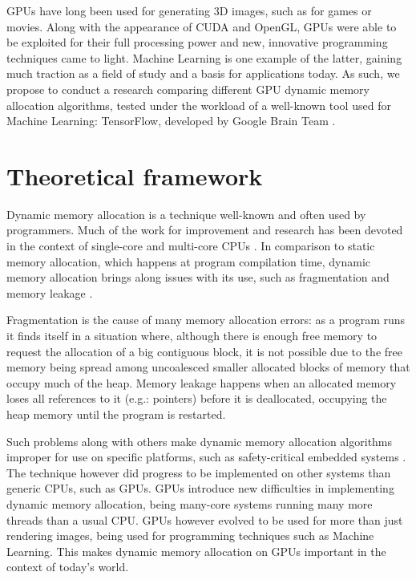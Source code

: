 \documentclass[12pt,twoside]{article}
\begin{document}
GPUs have long been used for generating 3D images, such as for games or movies. Along with the appearance of CUDA and OpenGL, GPUs were able to be exploited for their full processing power and new, innovative programming techniques came to light. Machine Learning is one example of the latter, gaining much traction as a field of study and a basis for applications today. As such, we propose to conduct a research comparing different GPU dynamic memory allocation algorithms, tested under the workload of a well-known tool used for Machine Learning: TensorFlow, developed by Google Brain Team \cite{abadi2016}.

\section{Theoretical framework}
\label{sec:theoretical-framework}

Dynamic memory allocation is a technique well-known and often used by programmers. Much of the work for improvement and research has been devoted in the context of single-core and multi-core CPUs \cite{YOU2015}. In comparison to static memory allocation, which happens at program compilation time, dynamic memory allocation brings along issues with its use, such as fragmentation and memory leakage \cite{TRAISTER199099}.

Fragmentation is the cause of many memory allocation errors: as a program runs it finds itself in a situation where, although there is enough free memory to request the allocation of a big contiguous block, it is not possible due to the free memory being spread among uncoalesced smaller allocated blocks of memory that occupy much of the heap. Memory leakage happens when an allocated memory loses all references to it (e.g.: pointers) before it is deallocated, occupying the heap memory until the program is restarted.

Such problems along with others make dynamic memory allocation algorithms improper for use on specific platforms, such as safety-critical embedded systems \cite{Puaut_2002}. The technique however did progress to be implemented on other systems than generic CPUs, such as GPUs. GPUs introduce new difficulties in implementing dynamic memory allocation, being many-core systems running many more threads than a usual CPU. GPUs however evolved to be used for more than just rendering images, being used for programming techniques such as Machine Learning. This makes dynamic memory allocation on GPUs important in the context of today's world.
\end{document}
